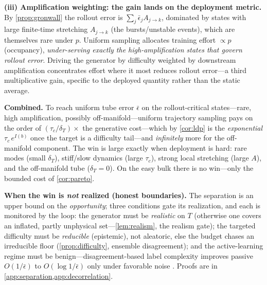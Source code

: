 \documentclass{article}
\theoremstyle{plain}
\theoremstyle{definition}
\theoremstyle{remark}
\newcommand{\pnat}{p}
\begin{document}
\textbf{(iii) Amplification weighting: the gain lands on the deployment metric.} By \cref{prop:gronwall} the
rollout error is $\sum_j\bar\epsilon_j A_{j\to k}$, dominated by states with large finite-time stretching
$A_{j\to k}$ (the bursts/unstable events), which are themselves rare under $\pnat$. Uniform sampling
allocates training effort $\propto\pnat$ (occupancy), \emph{under-serving exactly the high-amplification
states that govern rollout error}. Driving the generator by difficulty weighted by downstream amplification
concentrates effort where it most reduces rollout error---a third multiplicative gain, specific to the
deployed quantity rather than the static average.

\textbf{Combined.} To reach uniform tube error $\bar\epsilon$ on the rollout-critical states---rare, high
amplification, possibly off-manifold---uniform trajectory sampling pays on the order of
$(\tau_c/\delta_T)\times$ the generative cost---which by \cref{cor:ldp} is the \emph{exponential}
$\tau_c\,e^{I(b)}$ once the target is a difficulty tail---and \emph{infinitely} more for the off-manifold
component.
The win is large exactly when deployment is hard: rare modes (small $\delta_T$), stiff/slow dynamics
(large $\tau_c$), strong local stretching (large $A$), and the off-manifold tube ($\delta_T=0$). On the
easy bulk there is no win---only the bounded cost of \cref{cor:pareto}.

\textbf{When the win is \emph{not} realized (honest boundaries).} The separation is an upper bound on the
\emph{opportunity}; three conditions gate its realization, and each is monitored by the loop: the generator
must be \emph{realistic} on $T$ (otherwise one covers an inflated, partly unphysical set---\cref{lem:realism},
the realism gate); the targeted difficulty must be \emph{reducible} (epistemic), not aleatoric, else the
budget chases an irreducible floor (\cref{prop:difficulty}, ensemble disagreement); and the active-learning
regime must be benign---disagreement-based label complexity improves passive $O(1/\bar\epsilon)$ to
$O(\log1/\bar\epsilon)$ only under favorable noise \citep{hanneke2014theory,settles2009active}. Proofs are in
\cref{app:separation,app:decorrelation}.
\end{document}
